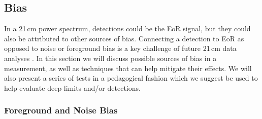 \documentclass[preprint2,numberedappendix,tighten]{aastex6}  %
\begin{document}


\subsection{Bias}
\label{sec:BiasOverview}

In a 21\,cm power spectrum, detections could be the EoR signal, but they could also 
be attributed to other sources of bias. Connecting a detection to EoR as opposed to noise or foreground bias is a key challenge of 
future 21\,cm data analyses \citep[e.g.][]{petrovic_and_oh2011}. In this section we will discuss possible sources of bias in a measurement, as well as techniques 
that can help mitigate their effects. We will also present a series of tests in a pedagogical fashion which we suggest be used to 
help evaluate deep limits and/or detections.

\subsubsection{Foreground and Noise Bias}
\label{sec:BiasTypes}
\end{document}
